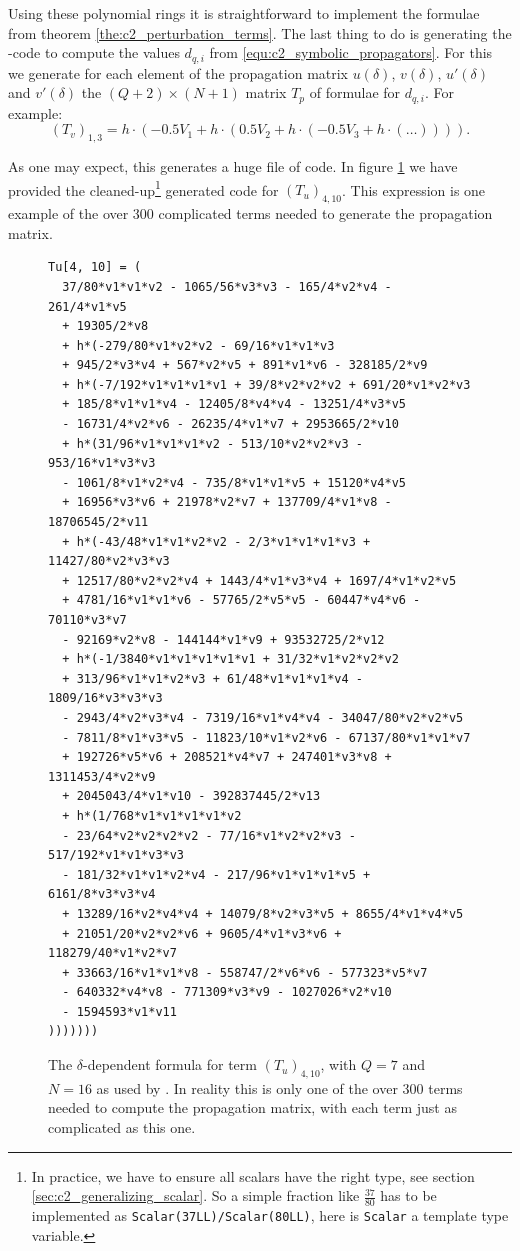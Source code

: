 Using these polynomial rings it is straightforward to implement the formulae from theorem \ref{the:c2_perturbation_terms}. The last thing to do is generating the \cpp{}-code to compute the values $d_{q,i}$ from \eqref{equ:c2_symbolic_propagators}. For this we generate for each element of the propagation matrix $u(\delta)$, $v(\delta)$, $u'(\delta)$ and $v'(\delta)$ the $(Q+2)\times (N+1)$ matrix $T_p$ of formulae for $d_{q,i}$. For example:
$$
    (T_v)_{1, 3} = h\cdot\left(-0.5 V_1 + h\cdot\left(0.5 V_2 + h\cdot\left(-0.5 V_3 + h\cdot\left(\dots\right)\right)\right)\right)\text{.}
$$

As one may expect, this generates a huge file of code. In figure \ref{fig:c2_generated_code} we have provided the cleaned-up\footnote{In practice, we have to ensure all scalars have the right type, see section \ref{sec:c2_generalizing_scalar}. So a simple fraction like $\frac{37}{80}$ has to be implemented as \texttt{Scalar(37LL)/Scalar(80LL)}, here is \texttt{Scalar} a template type variable.} generated code for $(T_u)_{4, 10}$. This expression is one example of the over $300$ complicated terms needed to generate the propagation matrix.

\begin{figure}
\begin{verbatim}
Tu[4, 10] = (
  37/80*v1*v1*v2 - 1065/56*v3*v3 - 165/4*v2*v4 - 261/4*v1*v5
  + 19305/2*v8
  + h*(-279/80*v1*v2*v2 - 69/16*v1*v1*v3
  + 945/2*v3*v4 + 567*v2*v5 + 891*v1*v6 - 328185/2*v9
  + h*(-7/192*v1*v1*v1*v1 + 39/8*v2*v2*v2 + 691/20*v1*v2*v3
  + 185/8*v1*v1*v4 - 12405/8*v4*v4 - 13251/4*v3*v5
  - 16731/4*v2*v6 - 26235/4*v1*v7 + 2953665/2*v10
  + h*(31/96*v1*v1*v1*v2 - 513/10*v2*v2*v3 - 953/16*v1*v3*v3
  - 1061/8*v1*v2*v4 - 735/8*v1*v1*v5 + 15120*v4*v5
  + 16956*v3*v6 + 21978*v2*v7 + 137709/4*v1*v8 - 18706545/2*v11
  + h*(-43/48*v1*v1*v2*v2 - 2/3*v1*v1*v1*v3 + 11427/80*v2*v3*v3
  + 12517/80*v2*v2*v4 + 1443/4*v1*v3*v4 + 1697/4*v1*v2*v5
  + 4781/16*v1*v1*v6 - 57765/2*v5*v5 - 60447*v4*v6 - 70110*v3*v7
  - 92169*v2*v8 - 144144*v1*v9 + 93532725/2*v12
  + h*(-1/3840*v1*v1*v1*v1*v1 + 31/32*v1*v2*v2*v2
  + 313/96*v1*v1*v2*v3 + 61/48*v1*v1*v1*v4 - 1809/16*v3*v3*v3
  - 2943/4*v2*v3*v4 - 7319/16*v1*v4*v4 - 34047/80*v2*v2*v5
  - 7811/8*v1*v3*v5 - 11823/10*v1*v2*v6 - 67137/80*v1*v1*v7
  + 192726*v5*v6 + 208521*v4*v7 + 247401*v3*v8 + 1311453/4*v2*v9
  + 2045043/4*v1*v10 - 392837445/2*v13
  + h*(1/768*v1*v1*v1*v1*v2
  - 23/64*v2*v2*v2*v2 - 77/16*v1*v2*v2*v3 - 517/192*v1*v1*v3*v3
  - 181/32*v1*v1*v2*v4 - 217/96*v1*v1*v1*v5 + 6161/8*v3*v3*v4
  + 13289/16*v2*v4*v4 + 14079/8*v2*v3*v5 + 8655/4*v1*v4*v5
  + 21051/20*v2*v2*v6 + 9605/4*v1*v3*v6 + 118279/40*v1*v2*v7
  + 33663/16*v1*v1*v8 - 558747/2*v6*v6 - 577323*v5*v7
  - 640332*v4*v8 - 771309*v3*v9 - 1027026*v2*v10
  - 1594593*v1*v11
)))))))
\end{verbatim}
    \caption{The $\delta$-dependent formula for term $(T_u)_{4, 10}$, with $Q = 7$ and $N = 16$ as used by . In reality this is only one of the over $300$ terms needed to compute the propagation matrix, with each term just as complicated as this one.}\label{fig:c2_generated_code}
\end{figure}


